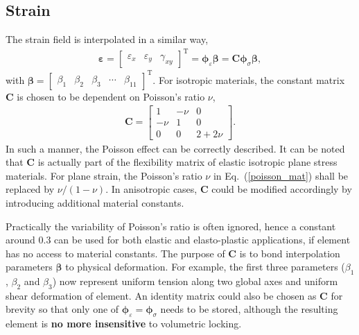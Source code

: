 \documentclass[3p,sort&compress,review,11pt]{elsarticle}
\newcommand*{\mT}{\mathrm{T}}
\newcommand*{\eqsref}[1]{Eq.~(\ref{#1})}
\newcommand*{\mb}{\bm}
\begin{document}
\subsection{Strain}
The strain field is interpolated in a similar way,
\begin{gather}
\mb{\varepsilon}=\begin{bmatrix}
	\varepsilon_x & \varepsilon_y & \gamma_{xy}
\end{bmatrix}^\mT=\mb{\phi}_\varepsilon\mb{\beta}=\mb{C}\mb{\phi}_\sigma\mb{\beta},
\end{gather}
with $\mb{\beta}=\begin{bmatrix}
	\beta_1 & \beta_2 & \beta_3 & \cdots & \beta_{11}
\end{bmatrix}^\mT$. For isotropic materials, the constant matrix $\mb{C}$ is chosen to be dependent on Poisson's ratio $\nu$,
\begin{gather}\label{poisson_mat}
\mb{C}=\begin{bmatrix}
	1    & -\nu & 0      \\
	-\nu & 1    & 0      \\
	0    & 0    & 2+2\nu
\end{bmatrix}.
\end{gather}
In such a manner, the Poisson effect can be correctly described. It can be noted that $\mb{C}$ is actually part of the flexibility matrix of elastic isotropic plane stress materials. For plane strain, the Poisson's ratio $\nu$ in \eqsref{poisson_mat} shall be replaced by $\nu/(1-\nu)$. In anisotropic cases, $\mb{C}$ could be modified accordingly by introducing additional material constants.

Practically the variability of Poisson's ratio is often ignored, hence a constant around \num{0.3} can be used for both elastic and elasto-plastic applications, if element has no access to material constants. The purpose of $\mb{C}$ is to bond interpolation parameters $\mb{\beta}$ to physical deformation. For example, the first three parameters ($\beta_1$, $\beta_2$ and $\beta_3$) now represent uniform tension along two global axes and uniform shear deformation of element. An identity matrix could also be chosen as $\mb{C}$ for brevity so that only one of $\mb{\phi}_\varepsilon=\mb{\phi}_\sigma$ needs to be stored, although the resulting element is \textbf{no more insensitive} to volumetric locking.
\end{document}
